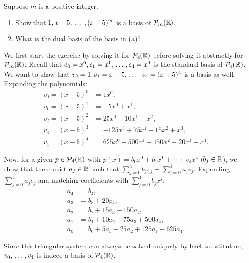 \begin{xrcs}
  Suppose $m$ is a positive integer.
  \begin{enumerate}
    \item Show that $1, x-5, {\, \ldots \,\,}, (x-5)^m$ is a basis of $\mathcal{P}_m(\mathbb{R})$.
    \item What is the dual basis of the basis in (a)?
  \end{enumerate}

  \begin{xsol}
    We first start the exercise by solving it for $\mathcal{P}_4(\mathbb{R})$ before solving it abstractly for $\mathcal{P}_m(\mathbb{R})$. Recall that $e_0 = x^0, e_1 = x^1, {\, \ldots \,\,}, e_4 = x^4$ is the standard basis of $\mathcal{P}_4(\mathbb{R})$. We want to show that $v_0 = 1, v_1 = x-5, {\, \ldots \,\,}, v_4 = (x-5)^4$ is a basis as well. Expanding the polynomials:
    \begin{equation}
      \begin{aligned}
        v_0 = (x-5)^0 &= 1x^0, \\
        v_1 = (x-5)^1 &= -5x^0 + x^1, \\
        v_2 = (x-5)^2 &= 25x^0 - 10x^1 + x^2, \\
        v_3 = (x-5)^3 &= -125x^0 + 75x^1 - 15x^2 + x^3, \\
        v_4 = (x-5)^4 &= 625x^0 - 500x^1 + 150x^2 - 20x^3 + x^4.
      \end{aligned}
    \end{equation}

    Now, for a given $p \in \mathcal{P}_4(\mathbb{R})$ with $p(x) = b_0 x^0 + b_1 x^1 + \cdots + b_4 x^4$ ($b_j \in \mathbb{R}$), we show that there exist $a_j \in \mathbb{R}$ such that $\sum_{j=0}^{4} b_j e_j = \sum_{j=0}^{4} a_j v_j$. Expanding $\sum_{j=0}^4 a_j v_j$ and matching coefficients with $\sum_{j=0}^4 b_j x^j$:
    \begin{equation}
      \begin{aligned}
        a_4 &= b_4, \\
        a_3 &= b_3 + 20 a_4, \\
        a_2 &= b_2 + 15 a_3 - 150 a_4, \\
        a_1 &= b_1 + 10 a_2 - 75 a_3 + 500 a_4, \\
        a_0 &= b_0 + 5a_1 - 25 a_2 + 125 a_3 - 625 a_4.
      \end{aligned}
    \end{equation}

    Since this triangular system can always be solved uniquely by back-substitution, $v_0, {\, \ldots \,\,}, v_4$ is indeed a basis of $\mathcal{P}_4(\mathbb{R})$.


\end{xsol}
\end{xrcs}
